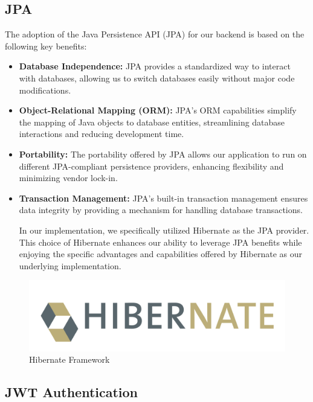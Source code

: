 \documentclass{Configuration_Files/Template}
\begin{document}
\subsection{JPA}
The adoption of the Java Persistence API (JPA) for our backend is based on the following key benefits:

\begin{itemize}
    \item \textbf{Database Independence:} JPA provides a standardized way to interact with databases, allowing us to switch databases easily without major code modifications.
    
    \item \textbf{Object-Relational Mapping (ORM):} JPA's ORM capabilities simplify the mapping of Java objects to database entities, streamlining database interactions and reducing development time.
    
    \item \textbf{Portability:} The portability offered by JPA allows our application to run on different JPA-compliant persistence providers, enhancing flexibility and minimizing vendor lock-in.
    
    \item \textbf{Transaction Management:} JPA's built-in transaction management ensures data integrity by providing a mechanism for handling database transactions.

In our implementation, we specifically utilized Hibernate as the JPA provider. This choice of Hibernate enhances our ability to leverage JPA benefits while enjoying the specific advantages and capabilities offered by Hibernate as our underlying implementation.\\
\end{itemize}

\begin{figure}[h]
    \centering
    \includegraphics[scale = 0.3]{ITD_latex/Images/Frameworks/hibernate.png}
    \caption{Hibernate Framework}
\end{figure}

\subsection{JWT Authentication}
\end{document}
